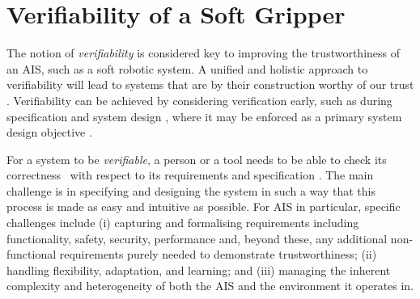 \documentclass[lettersize,journal]{IEEEtran}
\begin{document}
\section{Verifiability of a Soft Gripper} \label{verifiability}
The notion of \emph{verifiability} is considered key to improving the trustworthiness of an AIS, such as a soft robotic system. 
A unified and holistic approach to verifiability will lead to systems that are by their construction worthy of our trust \cite{Mousavi2022}. 
Verifiability can be achieved by considering verification early, such as during specification and system design \cite{Mousavi2022}, where it may be enforced as a primary system design objective \cite{Eder2021}. 

For a system to be {\em verifiable\/}, a person or a tool needs to be able to check its correctness~\cite{ISO24765:2017} with respect to its requirements and specification \cite{Abeywickrama2022}. 
The main challenge is in specifying and designing the system in such a way that this process is made as easy and intuitive as possible.
%
For AIS in particular, specific challenges include 
%
(i) capturing and formalising requirements including functionality, safety, security, performance and, beyond these, any additional non-functional requirements purely needed to demonstrate trustworthiness; 
%	 
(ii) handling flexibility, adaptation, and learning; and 
%
(iii) managing the inherent complexity and heterogeneity of both the AIS and the environment it operates in. 
\end{document}
